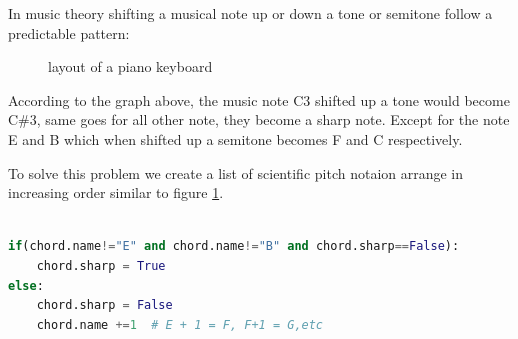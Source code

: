 \documentclass[a4paper,12pt]{report}
\begin{document}
In music theory shifting a musical note up or down a tone or semitone follow a
predictable pattern:

\begin{figure}[h]
    \caption{layout of a piano keyboard}
    \label{piano_keyboard}
\end{figure}

According to the graph above, the music note C3 shifted up a tone would become
C\#3, same goes for all other note, they become a sharp note. Except for the note
E and B which when shifted up a semitone becomes F and C respectively. 

To solve this problem we create a list of scientific pitch notaion arrange in 
increasing order similar to figure \ref{piano_keyboard}.\\

\noindent{}
\\

\newsavebox\myv
\begin{lrbox}{\myv}\begin{minipage}{\textwidth}
\begin{lstlisting}[language = python]
if(chord.name!="E" and chord.name!="B" and chord.sharp==False):
    chord.sharp = True
else:
    chord.sharp = False
    chord.name +=1  # E + 1 = F, F+1 = G,etc
\end{lstlisting}
\end{minipage}\end{lrbox}
\resizebox{0.95\textwidth}{!}{\usebox\myv}

\printbibliography
\end{document}
